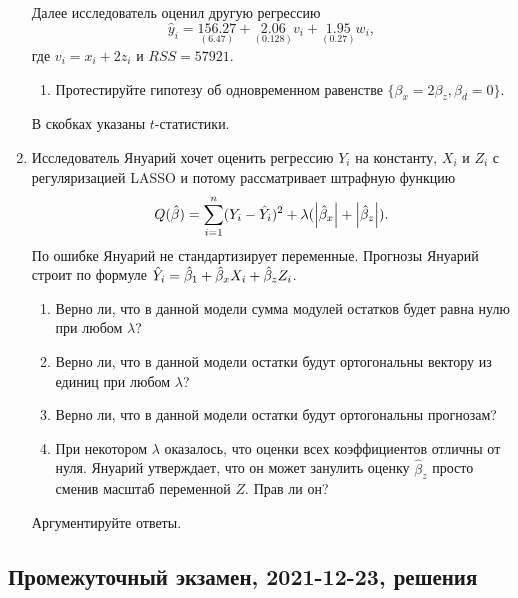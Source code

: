 \begin{enumerate}
    Далее исследователь оценил другую регрессию
    \[
    \hat{y}_{i} = \underset{(6.47)}{156.27}+\underset{(0.128)}{2.06} v_{i}+\underset{(0.27)}{1.95} w_{i},
    \]
    где $v_{i}=x_{i}+2 z_{i}$ и $RSS = 57921$.

    \begin{enumerate}[resume]
        \item Протестируйте гипотезу об одновременном равенстве $\{\beta_{x}=2 \beta_{z}, \beta_{d} = 0\}$.
    \end{enumerate}

    В скобках указаны $t$-статистики.

    \item Исследователь Януарий хочет оценить регрессию $Y_i$ на константу, $X_i$ и $Z_i$ с регуляризацией LASSO и потому рассматривает штрафную функцию 
    \[
        Q(\hat{\beta}) = \sum_{i=1}^n (Y_i - \hat Y_i)^2 + \lambda (\abs{\hat{\beta}_x} + \abs{\hat{\beta}_z}). 
    \]
    По ошибке Януарий не стандартизирует переменные.
    Прогнозы Януарий строит по формуле $\hat Y_i = \hat{\beta}_1 + \hat{\beta}_x X_i + \hat{\beta}_z Z_i$.

    \begin{enumerate}
        \item Верно ли, что в данной модели сумма модулей остатков будет равна нулю при любом $\lambda$?
        \item Верно ли, что в данной модели остатки будут ортогональны вектору из единиц при любом $\lambda$?
        \item Верно ли, что в данной модели остатки будут ортогональны прогнозам?
        \item При некотором $\lambda$ оказалось, что оценки всех коэффициентов отличны от нуля. 
        Януарий утверждает, что он может занулить оценку $\hat{\beta}_{z}$ просто сменив масштаб переменной $Z$. 
        Прав ли он?
    \end{enumerate}

    Аргументируйте ответы.
\end{enumerate}

\subsection{Промежуточный экзамен, 2021-12-23, решения}

